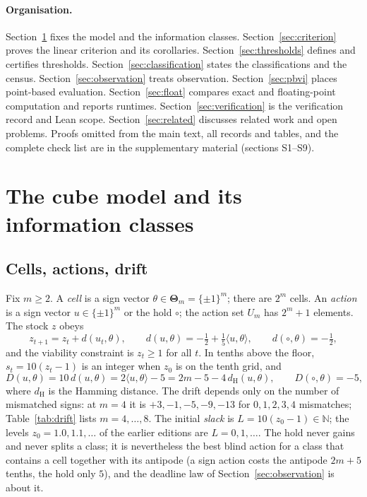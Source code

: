 \documentclass[11pt,a4paper]{article}
\theoremstyle{plain}
\theoremstyle{definition}
\theoremstyle{remark}
\newcommand{\N}{\mathbb{N}}
\let\GreekTheta\Theta
\renewcommand{\Theta}{\boldsymbol{\GreekTheta}}
\newcommand{\dH}{d_{\mathrm{H}}}
\newcommand{\tfr}[2]{\tfrac{#1}{#2}}
\begin{document}
\paragraph{Organisation.}
Section~\ref{sec:model} fixes the model and the information classes. Section~\ref{sec:criterion} proves the linear criterion and its corollaries. Section~\ref{sec:thresholds} defines and certifies thresholds. Section~\ref{sec:classification} states the classifications and the census. Section~\ref{sec:observation} treats observation. Section~\ref{sec:pbvi} places point-based evaluation. Section~\ref{sec:float} compares exact and floating-point computation and reports runtimes. Section~\ref{sec:verification} is the verification record and Lean scope. Section~\ref{sec:related} discusses related work and open problems. Proofs omitted from the main text, all records and tables, and the complete check list are in the supplementary material (sections S1--S9).
\section{The cube model and its information classes}\label{sec:model}

\subsection{Cells, actions, drift}
Fix $m\ge2$. A \emph{cell} is a sign vector $\theta\in\Theta_m=\{\pm1\}^m$; there are $2^m$ cells. An \emph{action} is a sign vector $u\in\{\pm1\}^m$ or the hold $\circ$; the action set $U_m$ has $2^m+1$ elements. The stock $z$ obeys
\begin{equation}\label{eq:drift}
z_{t+1}=z_t+d(u_t,\theta),\qquad d(u,\theta)=-\tfr12+\tfr15\langle u,\theta\rangle,\qquad d(\circ,\theta)=-\tfr12,
\end{equation}
and the viability constraint is $z_t\ge1$ for all $t$. In tenths above the floor, $s_t=10(z_t-1)$ is an integer when $z_0$ is on the tenth grid, and
\begin{equation}\label{eq:D}
D(u,\theta)=10\,d(u,\theta)=2\langle u,\theta\rangle-5=2m-5-4\,\dH(u,\theta),\qquad D(\circ,\theta)=-5,
\end{equation}
where $\dH$ is the Hamming distance. The drift depends only on the number of mismatched signs: at $m=4$ it is $+3,-1,-5,-9,-13$ for $0,1,2,3,4$ mismatches; Table~\ref{tab:drift} lists $m=4,\dots,8$. The initial \emph{slack} is $L=10(z_0-1)\in\N$; the levels $z_0=1.0,1.1,\dots$ of the earlier editions are $L=0,1,\dots$. The hold never gains and never splits a class; it is nevertheless the best blind action for a class that contains a cell together with its antipode (a sign action costs the antipode $2m+5$ tenths, the hold only $5$), and the deadline law of Section~\ref{sec:observation} is about it.
\end{document}
